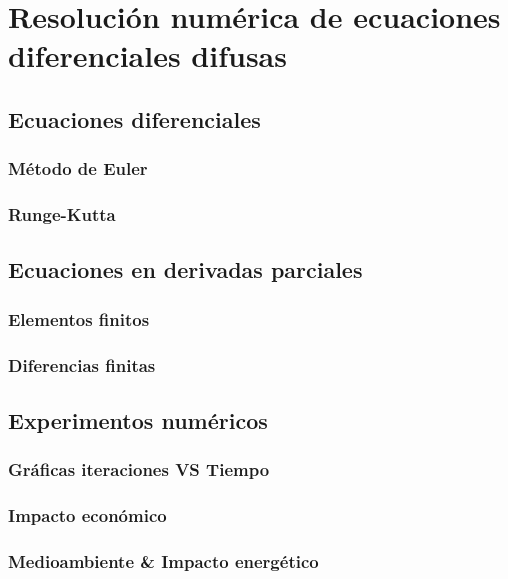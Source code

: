 \chapter{Resolución numérica de ecuaciones diferenciales difusas}

\section{Ecuaciones diferenciales}

\subsection{Método de Euler}
\subsection{Runge-Kutta}

\section{Ecuaciones en derivadas parciales}

\subsection{Elementos finitos}
\subsection{Diferencias finitas}

\section{Experimentos numéricos}

\subsection{Gráficas iteraciones VS Tiempo}
\subsection{Impacto económico}
\subsection{Medioambiente \& Impacto energético}
